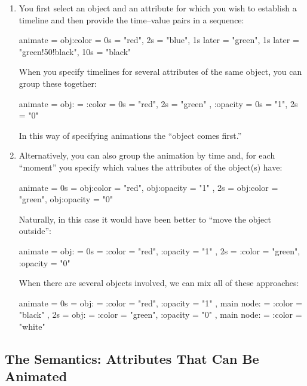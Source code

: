 \begin{enumerate}
\item You first select an object and an attribute for which you wish
  to establish a timeline and then provide the time--value pairs in a
  sequence:
\begin{codeexample}
animate = {    
  obj:color = {
    0s = "red",
    2s = "blue",
    1s later = "green",
    1s later = "green!50!black",
    10s = "black"
  }
}
\end{codeexample}
  When you specify timelines for several attributes of the same
  object, you can group these together:
\begin{codeexample}
animate = {    
  obj: = {
    :color = { 0s = "red", 2s = "green" },
    :opacity = { 0s = "1", 2s = "0" }
  }
}
\end{codeexample}
  In this way of specifying animations the ``object comes first.''
\item
  Alternatively, you can also group the animation by time and, for
  each ``moment'' you specify which values the attributes of the
  object(s) have:
\begin{codeexample}
animate = {    
  0s = {
    obj:color = "red",
    obj:opacity = "1"
  },
  2s = {
    obj:color = "green",
    obj:opacity = "0" 
  }
}
\end{codeexample}
  Naturally, in this case it would have been better to ``move the
  object outside'': 
\begin{codeexample}
animate = {
  obj: = {
    0s = {
      :color = "red",
      :opacity = "1"
    },
    2s = {
      :color = "green",
      :opacity = "0" 
    }
  }
}
\end{codeexample}
  When there are several objects involved, we can mix all of these
  approaches: 
\begin{codeexample}
animate = {    
  0s = {
    obj: = {
      :color = "red",
      :opacity = "1"
    },
    main node: = {
      :color = "black"
    }
  },
  2s = {
    obj: = {
      :color = "green",
      :opacity = "0"
    },
    main node: = {
      :color = "white"
    }
  }
}
\end{codeexample}
\end{enumerate}






\subsection{The Semantics: Attributes That Can Be Animated}

